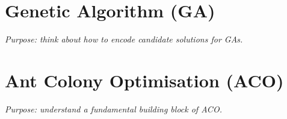 \documentclass[a4paper]{article}
\begin{document}
%
%



\section*{Genetic Algorithm (GA)}

\emph{Purpose: think about how to encode candidate solutions for GAs.}



\section*{Ant Colony Optimisation (ACO)}

\emph{Purpose: understand a fundamental building block of ACO.}
\end{document}
